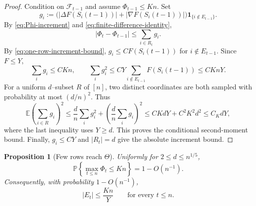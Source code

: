 \documentclass[reqno,english]{amsart}
\newcommand*{\PP}{\mathbb P}
\newcommand*{\EE}{\mathbb E}
\newcommand*{\calF}{\mathcal F}
\newcommand*{\ind}{\mathbf 1}
\newtheorem{proposition}[proposition]{Proposition}
\theoremstyle{definition}
\begin{document}
\begin{proof}
Condition on $\calF_{t-1}$ and assume $\Phi_{t-1}\le Kn$.  Set
\[
 g_i:=\big(|\Delta F(S_i(t-1))|+|\nabla F(S_i(t-1))|\big)
       \ind_{\{i\notin E_{t-1}\}}.
\]
By \eqref{eq:Phi-increment} and \eqref{eq:finite-difference-identity},
\[
 |\Phi_t-\Phi_{t-1}|\le\sum_{i\in R_t}g_i.
\]
{
By \eqref{eq:one-row-increment-bound},
$g_i\le CF(S_i(t-1))$ for $i\notin E_{t-1}$. Since $F\le Y$,
}
\[
 \sum_i g_i\le CK n,
 \qquad
 \sum_i g_i^2\le CY\sum_{i\notin E_{t-1}}F(S_i(t-1))
                  \le CK nY.
\]
For a uniform $d$--subset $R$ of $[n]$, two distinct coordinates are both
sampled with probability at most $(d/n)^2$.  Thus
\begin{equation}\label{eq:sampling-second-moment}
 \EE\left(\sum_{i\in R}g_i\right)^2
 \le\frac dn\sum_i g_i^2
      +\left(\frac dn\sum_i g_i\right)^2
 \le CKdY+C^2K^2d^2
 \le C_KdY,
\end{equation}
where the last inequality uses $Y\ge d$.  This proves the conditional
second-moment bound.  Finally, $g_i\le CY$ and $|R_t|=d$ give the
absolute increment bound.
\end{proof}

\begin{proposition}[Few rows reach $\Theta$]\label{prop:few-exceptional}
Uniformly for $2\le d\le {n^{1/5}}$,
\begin{equation}\label{eq:Phi-control}
    \PP\left\{\max_{t\le n}\Phi_t\le Kn\right\}=1-O(n^{-1}).
\end{equation}
Consequently, with probability $1-O(n^{-1})$,
\begin{equation}\label{eq:E-control}
    |E_t|\le\frac{Kn}{Y}
    \qquad\text{for every }t\le n.
\end{equation}
\end{proposition}
\end{document}
